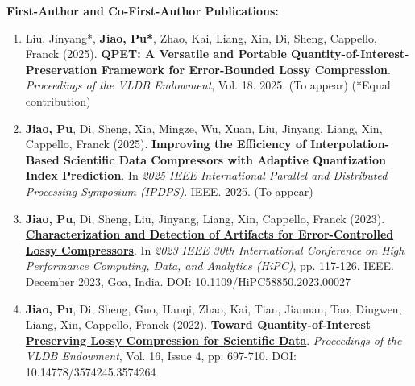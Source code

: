 \documentclass[a4paper,11pt]{article}
\begin{document}
\textbf{First-Author and Co-First-Author Publications:}
\small{
\begin{enumerate}[leftmargin=*, labelsep=0.5em]
\item Liu, Jinyang*, \textbf{Jiao, Pu*}, Zhao, Kai, Liang, Xin, Di, Sheng, Cappello, Franck (2025). \textbf{QPET: A Versatile and Portable Quantity-of-Interest-Preservation Framework for Error-Bounded Lossy Compression}. \textit{Proceedings of the VLDB Endowment}, Vol. 18. 2025. (To appear) (*Equal contribution)

\item \textbf{Jiao, Pu}, Di, Sheng, Xia, Mingze, Wu, Xuan, Liu, Jinyang, Liang, Xin, Cappello, Franck (2025). \textbf{Improving the Efficiency of Interpolation-Based Scientific Data Compressors with Adaptive Quantization Index Prediction}. In \textit{2025 IEEE International Parallel and Distributed Processing Symposium (IPDPS)}. IEEE. 2025. (To appear)

\item \textbf{Jiao, Pu}, Di, Sheng, Liu, Jinyang, Liang, Xin, Cappello, Franck (2023). \href{https://doi.org/10.1109/HiPC58850.2023.00027}{\textbf{Characterization and Detection of Artifacts for Error-Controlled Lossy Compressors}}. In \textit{2023 IEEE 30th International Conference on High Performance Computing, Data, and Analytics (HiPC)}, pp. 117-126. IEEE. December 2023, Goa, India. DOI: 10.1109/HiPC58850.2023.00027

\item \textbf{Jiao, Pu}, Di, Sheng, Guo, Hanqi, Zhao, Kai, Tian, Jiannan, Tao, Dingwen, Liang, Xin, Cappello, Franck (2022). \href{https://doi.org/10.14778/3574245.3574264}{\textbf{Toward Quantity-of-Interest Preserving Lossy Compression for Scientific Data}}. \textit{Proceedings of the VLDB Endowment}, Vol. 16, Issue 4, pp. 697-710. DOI: 10.14778/3574245.3574264
\end{enumerate}
}
\end{document}
